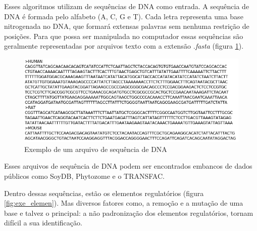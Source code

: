 Esses algoritmos utilizam de sequências de DNA como entrada. A sequência de DNA é formada pelo alfabeto (A, C, G e T). Cada letra representa uma base nitrogenada no DNA, que formará extensas palavras sem nenhuma restrição de posições. Para que possa ser manipulada no computador essas sequências são geralmente representadas por arquivos texto com a extensão \textit{.fasta} (figura \ref{fig:exe_seq}).

\begin{figure}[htb!]
    \centering
    \includegraphics[scale=0.7]{./imagens/exe_seq.png}
    \caption{Exemplo de um arquivo de sequência de DNA}
    \label{fig:exe_seq}
\end{figure}

Esses arquivos de sequência de DNA podem ser encontrados embancos de dados públicos como SoyDB, Phytozome e o TRANSFAC.

Dentro dessas sequências, estão os elementos regulatórios (figura \ref{fig:exe_elemen}). Mas diversos fatores como, a remoção e a mutação de uma base e talvez o principal: a não padronização dos elementos regulatórios, tornam difícil a sua identificação.

